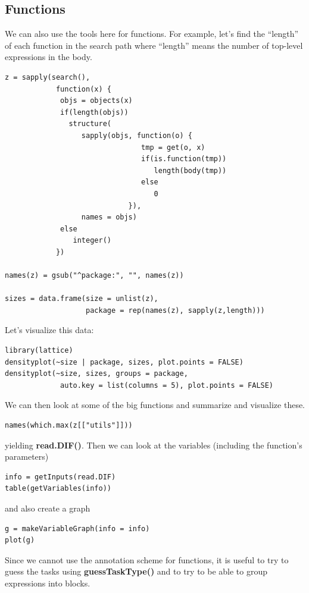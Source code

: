 \documentclass{article}
\def\Rfunc#1{\textbf{#1()}}
\begin{document}
\subsection{Functions}
We can also use the tools here for functions.
For example, let's find the ``length'' of
each function in the search path where ``length''
means the number of top-level expressions in the 
body.
\begin{verbatim}
z = sapply(search(), 
            function(x) {
             objs = objects(x)
             if(length(objs))
               structure(
                  sapply(objs, function(o) { 
                                tmp = get(o, x)
                                if(is.function(tmp)) 
                                   length(body(tmp)) 
                                else 
                                   0
                             }),
                  names = objs)
             else
                integer()
            })

names(z) = gsub("^package:", "", names(z))

sizes = data.frame(size = unlist(z), 
                   package = rep(names(z), sapply(z,length)))
\end{verbatim}
Let's visualize this data:
\begin{verbatim}
library(lattice)
densityplot(~size | package, sizes, plot.points = FALSE)
densityplot(~size, sizes, groups = package, 
             auto.key = list(columns = 5), plot.points = FALSE)
\end{verbatim}
We can then look at some of the big functions and summarize and visualize
these.
\begin{verbatim}
names(which.max(z[["utils"]]))
\end{verbatim}
yielding \Rfunc{read.DIF}.
Then we can look at the variables (including the function's parameters)
\begin{verbatim}
info = getInputs(read.DIF)
table(getVariables(info))
\end{verbatim}
and also create a graph
\begin{verbatim}
g = makeVariableGraph(info = info)
plot(g)
\end{verbatim}
Since we cannot use the annotation scheme for functions, 
it is useful to try to guess the tasks using
\Rfunc{guessTaskType} and to try to be able to 
group expressions into blocks.
\end{document}
